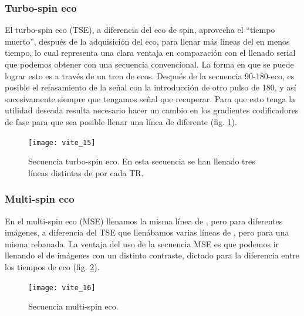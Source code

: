 \subsubsection{Turbo-spin eco}
El turbo-spin eco (TSE), a diferencia del eco de spin, aprovecha el ``tiempo muerto'', después de la adquisición del eco, para llenar más líneas del \espaciok en menos tiempo, lo cual representa una clara ventaja en comparación con el llenado serial que podemos obtener con una secuencia convencional.
La forma en que se puede lograr esto es a través de un tren de ecos. Después de la secuencia 90-180-eco, es posible el refasamiento de la señal con la introducción de otro pulso de 180\degrees, y así sucesivamente siempre que tengamos señal que recuperar. Para que esto tenga la utilidad deseada resulta necesario hacer un cambio en los gradientes codificadores de fase para que sea posible llenar una línea de \espaciok diferente (fig. \ref{fig:seq_TSE}).


\begin{figure}[htb]
\begin{figg}
   \texttt{[image: vite\_15]}
   \caption{Secuencia turbo-spin eco. En esta secuencia se han llenado tres líneas distintas de \espaciok por cada TR.}
 \label{fig:seq_TSE}
 \end{figg}
\end{figure}




\subsubsection{Multi-spin eco}
En el multi-spin eco (MSE) llenamos la misma línea de \espaciok, pero para diferentes imágenes, a diferencia del TSE que llenábamos varias líneas de \espaciok, pero para una misma rebanada.  La ventaja del uso de la secuencia MSE es que podemos ir llenando el \espaciok de imágenes con un distinto contraste, dictado para la diferencia entre los tiempos de eco (fig. \ref{fig:seq_MSE}).



\begin{figure}[htb]
\begin{figg}
   \texttt{[image: vite\_16]}
   \caption{Secuencia multi-spin eco.}
 \label{fig:seq_MSE}
 \end{figg}
\end{figure}



